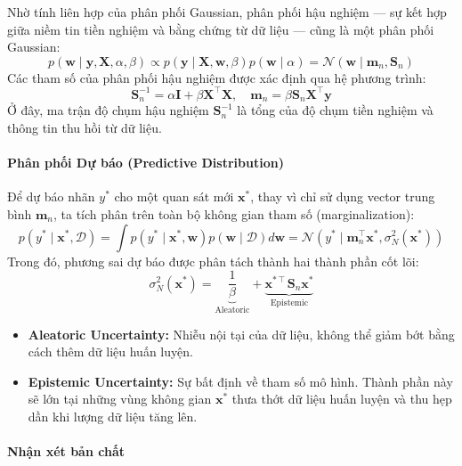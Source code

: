 Nhờ tính liên hợp của phân phối Gaussian, phân phối hậu nghiệm — sự kết hợp giữa niềm tin tiền nghiệm và bằng chứng từ dữ liệu — cũng là một phân phối Gaussian:
\[
p(\boldsymbol{w} \mid \boldsymbol{y}, \boldsymbol{X}, \alpha, \beta) \propto p(\boldsymbol{y} \mid \boldsymbol{X}, \boldsymbol{w}, \beta) p(\boldsymbol{w} \mid \alpha) = \mathcal{N}(\boldsymbol{w} \mid \boldsymbol{m}_n, \boldsymbol{S}_n)
\]
Các tham số của phân phối hậu nghiệm được xác định qua hệ phương trình:
\[
\boldsymbol{S}_n^{-1} = \alpha\boldsymbol{I} + \beta\boldsymbol{X}^\intercal\boldsymbol{X}, \quad \boldsymbol{m}_n = \beta\boldsymbol{S}_n\boldsymbol{X}^\intercal\boldsymbol{y}
\]
Ở đây, ma trận độ chụm hậu nghiệm $\boldsymbol{S}_n^{-1}$ là tổng của độ chụm tiền nghiệm và thông tin thu hồi từ dữ liệu.

\paragraph{Phân phối Dự báo (Predictive Distribution)}

Để dự báo nhãn $y^\ast$ cho một quan sát mới $\boldsymbol{x}^\ast$, thay vì chỉ sử dụng vector trung bình $\boldsymbol{m}_n$, ta tích phân trên toàn bộ không gian tham số (marginalization):
\[
p(y^\ast \mid \boldsymbol{x}^\ast, \mathcal{D}) = \int p(y^\ast \mid \boldsymbol{x}^\ast, \boldsymbol{w}) p(\boldsymbol{w} \mid \mathcal{D}) d\boldsymbol{w} = \mathcal{N}(y^\ast \mid \boldsymbol{m}_n^\intercal \boldsymbol{x}^\ast, \sigma_N^2(\boldsymbol{x}^\ast))
\]
Trong đó, phương sai dự báo được phân tách thành hai thành phần cốt lõi:
\[
\sigma_N^2(\boldsymbol{x}^\ast) = \underbrace{\frac{1}{\beta}}_{\text{Aleatoric}} + \underbrace{\boldsymbol{x}^{\ast\intercal}\boldsymbol{S}_n\boldsymbol{x}^\ast}_{\text{Epistemic}}
\]
\begin{itemize}
    \item \textbf{Aleatoric Uncertainty:} Nhiễu nội tại của dữ liệu, không thể giảm bớt bằng cách thêm dữ liệu huấn luyện.
    \item \textbf{Epistemic Uncertainty:} Sự bất định về tham số mô hình. Thành phần này sẽ lớn tại những vùng không gian $\boldsymbol{x}^\ast$ thưa thớt dữ liệu huấn luyện và thu hẹp dần khi lượng dữ liệu tăng lên.
\end{itemize}

\paragraph{Nhận xét bản chất}

